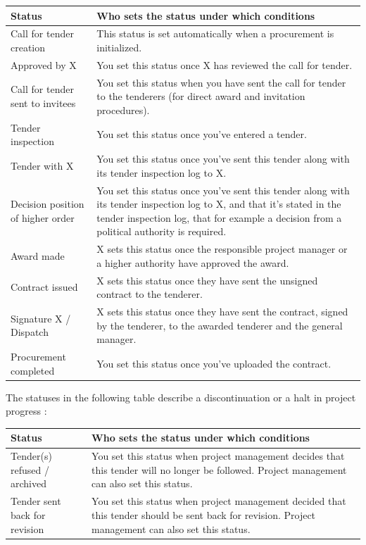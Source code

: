 \begin{tabular}{|p{5cm}|p{9.5cm}|}    %
\hline
\textbf{Status} & \textbf{Who sets the status under which conditions} \\
\hline
Call for tender creation & This status is set automatically when a procurement is initialized. \\
\hline
Approved by X & You set this status once X has reviewed the call for tender. \\
\hline
Call for tender sent to invitees & You set this status when you have sent the call for tender to the tenderers (for direct award
and invitation procedures). \\
\hline
Tender inspection & You set this status once you've entered a tender. \\
\hline
Tender with X & You set this status once you've sent this tender along with its tender inspection log to X. \\
\hline
Decision position of higher order & You set this status once you've sent this tender along with its tender inspection log to X, and that it's stated in the tender inspection log, that for example a decision from a political authority is required. \\
\hline
Award made & X sets this status once the responsible project manager or a higher authority have approved the award. \\
\hline
Contract issued & X sets this status once they have sent the unsigned contract to the tenderer. \\
\hline
Signature X / Dispatch & X sets this status once they have sent the contract, signed by the tenderer, to the awarded tenderer and the general manager. \\
\hline
Procurement completed & You set this status once you've uploaded the contract. \\
\hline
\end{tabular}

\vspace{\baselineskip}

The statuses in the following table describe a discontinuation or a halt in project progress :

\vspace{\baselineskip}

\begin{tabular}{|p{5cm}|p{9.5cm}|}    %
\hline
\textbf{Status} & \textbf{Who sets the status under which conditions} \\
\hline
Tender(s) refused / archived & You set this status when project management decides that this tender will no longer be followed. Project management can also set this status. \\
\hline
Tender sent back for revision & You set this status when project management decided that this tender should be sent back for revision. Project management can also set this status. \\
\hline
\end{tabular}

